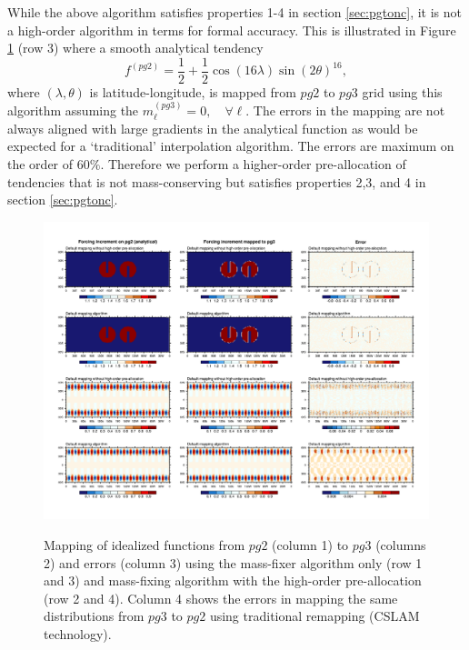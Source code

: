 While the above algorithm satisfies properties 1-4 in section \ref{sec:pgtonc}, it is not a high-order algorithm in terms for formal accuracy. This is illustrated in Figure \ref{fig:mapping} (row 3) where a smooth analytical tendency \citep[approximate spherical harmonic of order 32 and azimuthal wave number 16; ][]{J1999MWR}
\begin{equation}
\label{eq:Y32}
f^{(pg2)}=\frac{1}{2}+\frac{1}{2}\cos(16\lambda)\sin(2\theta)^{16},
\end{equation}
where $(\lambda,\theta)$ is latitude-longitude, is mapped from $pg2$ to $pg3$ grid using this algorithm assuming the $m^{(pg3)}_\ell=0, \quad \forall \ell$. The errors in the mapping are not always aligned with large gradients in the analytical function as would be expected for a `traditional' interpolation algorithm. The errors are maximum on the order of 60$\%$. Therefore we perform a higher-order pre-allocation of tendencies that is not mass-conserving but satisfies properties 2,3, and 4 in section \ref{sec:pgtonc}.

\begin{figure}[t]
\begin{center}
\noindent\includegraphics[width=30pc,angle=0]{figs/mapping.pdf}\\
\end{center}
\caption{Mapping of idealized functions from $pg2$ (column 1) to $pg3$ (columns 2) and errors (column 3) using the mass-fixer algorithm only (row 1 and 3) and mass-fixing algorithm with the high-order pre-allocation (row 2 and 4). Column 4 shows the errors in mapping the same distributions from  $pg3$ to $pg2$ using traditional remapping (CSLAM technology).}
\label{fig:mapping}
\end{figure}

